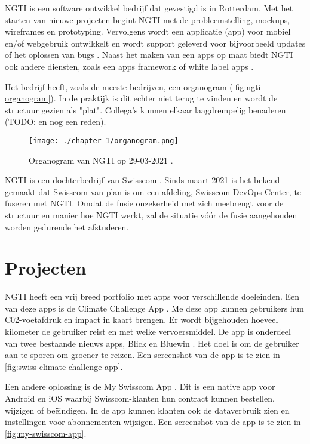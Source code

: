 
NGTI is een software ontwikkel bedrijf dat gevestigd is in Rotterdam. Met het starten van nieuwe projecten begint NGTI met de probleemstelling, mockups, wireframes en prototyping. Vervolgens wordt een applicatie (app) voor mobiel en/of webgebruik ontwikkelt en wordt support geleverd voor bijvoorbeeld updates of het oplossen van bugs \cite{ngti-services}. Naast het maken van een apps op maat biedt NGTI ook andere diensten, zoals een apps framework of white label apps \cite{ngti-solutions}.

Het bedrijf heeft, zoals de meeste bedrijven, een organogram (\autoref{fig:ngti-organogram}). In de praktijk is dit echter niet terug te vinden en wordt de structuur gezien als "plat". Collega's kunnen elkaar laagdrempelig benaderen (TODO: en nog een reden).

\begin{figure}[hbt!]
  \centering
  \texttt{[image: ./chapter-1/organogram.png]}
  \caption{Organogram van NGTI op 29-03-2021 \cite{ngti-organogram}.}
  \label{fig:ngti-organogram}
\end{figure}

NGTI is een dochterbedrijf van Swisscom \cite{swisscom-other-division}. Sinds maart 2021 is het bekend gemaakt dat Swisscom van plan is om een afdeling, Swisscom DevOps Center, te fuseren met NGTI. Omdat de fusie onzekerheid met zich meebrengt voor de structuur en manier hoe NGTI werkt, zal de situatie vóór de fusie aangehouden worden gedurende het afstuderen.

\section{Projecten}\label{sec:projecten}
NGTI heeft een vrij breed portfolio met apps voor verschillende doeleinden. Een van deze apps is de Climate Challenge App \cite{ngti-swisscom-climate-challenge}. Me deze app kunnen gebruikers hun C02-voetafdruk en impact in kaart brengen. Er wordt bijgehouden hoeveel kilometer de gebruiker reist en met welke vervoersmiddel. De app is onderdeel van twee bestaande nieuws apps, Blick en Bluewin \cite{swisscom-climate-challenge-integration}. Het doel is om de gebruiker aan te sporen om groener te reizen. Een screenshot van de app is te zien in \autoref{fig:swiss-climate-challenge-app}.

Een andere oplossing is de My Swisscom App \cite{ngti-my-swisscom-app}. Dit is een native app voor Android en iOS waarbij Swisscom-klanten hun contract kunnen bestellen, wijzigen of beëindigen. In de app kunnen klanten ook de dataverbruik zien en instellingen voor abonnementen wijzigen. Een screenshot van de app is te zien in \autoref{fig:my-swisscom-app}.

